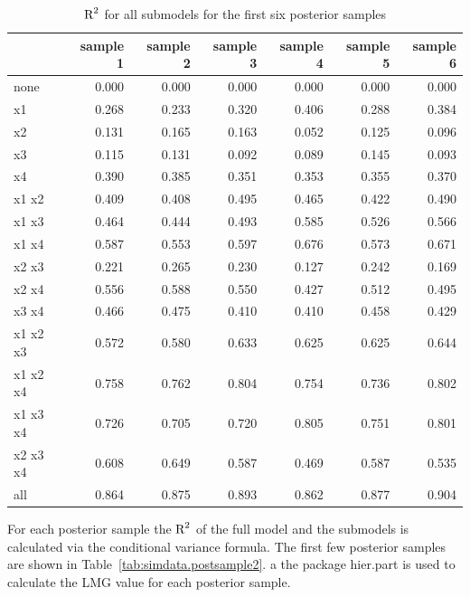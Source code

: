 \documentclass[11pt,a4paper,twoside]{book}
\newenvironment{knitrout}{}{} %
\begin{document}
\begin{knitrout}
\color{fgcolor}\begin{table}

\caption{\label{tab:simdata.postsample3}$ \text{R}^2$ for all submodels for the first six posterior samples}
\centering
\begin{tabular}[t]{lrrrrrr}
\toprule
  & sample 1 & sample 2 & sample 3 & sample 4 & sample 5 & sample 6\\
\midrule
none & 0.000 & 0.000 & 0.000 & 0.000 & 0.000 & 0.000\\
x1 & 0.268 & 0.233 & 0.320 & 0.406 & 0.288 & 0.384\\
x2 & 0.131 & 0.165 & 0.163 & 0.052 & 0.125 & 0.096\\
x3 & 0.115 & 0.131 & 0.092 & 0.089 & 0.145 & 0.093\\
x4 & 0.390 & 0.385 & 0.351 & 0.353 & 0.355 & 0.370\\
x1 x2 & 0.409 & 0.408 & 0.495 & 0.465 & 0.422 & 0.490\\
x1 x3 & 0.464 & 0.444 & 0.493 & 0.585 & 0.526 & 0.566\\
x1 x4 & 0.587 & 0.553 & 0.597 & 0.676 & 0.573 & 0.671\\
x2 x3 & 0.221 & 0.265 & 0.230 & 0.127 & 0.242 & 0.169\\
x2 x4 & 0.556 & 0.588 & 0.550 & 0.427 & 0.512 & 0.495\\
x3 x4 & 0.466 & 0.475 & 0.410 & 0.410 & 0.458 & 0.429\\
x1 x2 x3 & 0.572 & 0.580 & 0.633 & 0.625 & 0.625 & 0.644\\
x1 x2 x4 & 0.758 & 0.762 & 0.804 & 0.754 & 0.736 & 0.802\\
x1 x3 x4 & 0.726 & 0.705 & 0.720 & 0.805 & 0.751 & 0.801\\
x2 x3 x4 & 0.608 & 0.649 & 0.587 & 0.469 & 0.587 & 0.535\\
all & 0.864 & 0.875 & 0.893 & 0.862 & 0.877 & 0.904\\
\bottomrule
\end{tabular}
\end{table}


\end{knitrout}

For each posterior sample the $\text{R}^2$ of the full model and the submodels is calculated via the conditional variance formula. The first few posterior samples are shown in Table~\ref{tab:simdata.postsample2}.  a the package hier.part is used to calculate the LMG value for each posterior sample.
\end{document}
